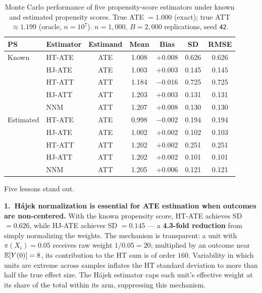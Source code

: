 \documentclass[master.tex]{subfiles}
\begin{document}
\begin{table}[h]
\centering
\renewcommand{\arraystretch}{1.5}
\caption{Monte Carlo performance of five propensity-score estimators
  under known and estimated propensity scores.
  True ATE $= 1.000$ (exact); true ATT $\approx 1.199$ (oracle, $n=10^7$).
  $n = 1{,}000$, $B = 2{,}000$ replications, seed \texttt{42}.}
\label{w6:tab:lab}
\begin{tabular}{llccccc}
\toprule
\textbf{PS} & \textbf{Estimator} & \textbf{Estimand}
  & \textbf{Mean} & \textbf{Bias} & \textbf{SD} & \textbf{RMSE} \\
\midrule
Known
  & HT-ATE  & ATE & 1.008 & $+$0.008 & 0.626 & 0.626 \\
  & HJ-ATE  & ATE & 1.003 & $+$0.003 & 0.145 & 0.145 \\[3pt]
  & HT-ATT  & ATT & 1.184 & $-$0.016 & 0.725 & 0.725 \\
  & HJ-ATT  & ATT & 1.203 & $+$0.003 & 0.131 & 0.131 \\
  & NNM     & ATT & 1.207 & $+$0.008 & 0.130 & 0.130 \\
\midrule
Estimated
  & HT-ATE  & ATE & 0.998 & $-$0.002 & 0.194 & 0.194 \\
  & HJ-ATE  & ATE & 1.002 & $+$0.002 & 0.102 & 0.103 \\[3pt]
  & HT-ATT  & ATT & 1.202 & $+$0.002 & 0.251 & 0.251 \\
  & HJ-ATT  & ATT & 1.202 & $+$0.002 & 0.101 & 0.101 \\
  & NNM     & ATT & 1.205 & $+$0.006 & 0.121 & 0.121 \\
\bottomrule
\end{tabular}
\end{table}

\medskip
Five lessons stand out.

\medskip
\noindent\textbf{1.\ Hájek normalization is essential for ATE
estimation when outcomes are non-centered.}
With the known propensity score, HT-ATE achieves SD $= 0.626$, while
HJ-ATE achieves SD $= 0.145$ --- a \textbf{4.3-fold reduction} from
simply normalizing the weights.  The mechanism is transparent: a unit
with $\pi(X_i) = 0.05$ receives raw weight $1/0.05 = 20$; multiplied
by an outcome near $\mathbb{E}[Y(0)] = 8$, its contribution to the HT sum is
of order $160$.  Variability in which units are extreme across samples
inflates the HT standard deviation to more than half the true effect
size.  The Hájek estimator caps each unit's effective weight at its
share of the total within its arm, suppressing this mechanism.
\end{document}
